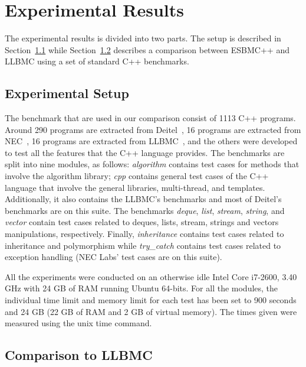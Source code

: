 \documentclass[a4paper]{llncs}
\begin{document}
\section{Experimental Results}

The experimental results is divided into two parts.
The setup is described in Section~\ref{experimental-setup}
while Section~\ref{comparison-to-LLBMC} describes a comparison
between ESBMC++ and LLBMC using a set of standard C++ benchmarks.

\subsection{Experimental Setup}
\label{experimental-setup}

The benchmark that are used in our comparison consist of 1113 C++ programs.
Around 290 programs are extracted from Deitel~\cite{Deitel},
16 programs are extracted from NEC~\cite{NeclabsBenchmarkExceptions},
16 programs are extracted from LLBMC~\cite{PrabhuMBIG11},
and the others were developed to test all the features that the C++ language
provides. The benchmarks are split into nine modules, as follows:
\textit{algorithm} contains test cases for methods that involve the
algorithm library; \textit{cpp} contains general test cases of the C++
language that involve the general libraries, multi-thread, and templates.
Additionally, it also contains the LLBMC's benchmarks and most of Deitel's
benchmarks are on this suite. The benchmarks \textit{deque}, \textit{list},
\textit{stream}, \textit{string}, and \textit{vector} contain test cases
related to deques, lists, stream, strings and vectors manipulations, respectively.
Finally, \textit{inheritance} contains test cases related to inheritance and
polymorphism while \textit{try\_catch} contains test cases related to exception handling
(NEC Labs' test cases are on this suite).

All the experiments were conducted on an otherwise idle Intel Core i7-2600,
3.40 GHz with 24 GB of RAM running Ubuntu 64-bits. For all the modules,
the individual time limit and memory limit for each test has been set to 900 seconds
and 24 GB (22 GB of RAM and 2 GB of virtual memory). The times given were measured
using the unix time command.

\subsection{Comparison to LLBMC}
\label{comparison-to-LLBMC}
\end{document}
